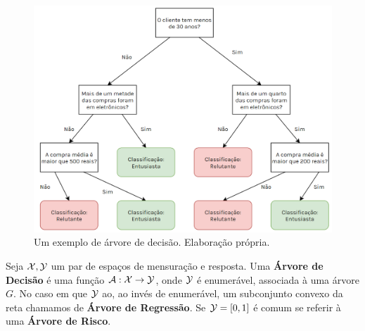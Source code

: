 \begin{figure}
    \centering
    \includegraphics[scale = .55]{imagens/arvore.png}
    \caption{Um exemplo de árvore de decisão. Elaboração própria.}
    \label{fig:arvore}
\end{figure}


\begin{defi}
Seja $\mathcal{X}, \mathcal{Y}$ um par de espaços de mensuração e resposta. Uma \textbf{Árvore de Decisão} é uma função $\mathcal{A}: \mathcal{X} \to \mathcal{Y}$, onde $\mathcal{Y}$ é enumerável, associada à uma árvore $G$. No caso em que $\mathcal{Y}$ ao, ao invés de enumerável, um subconjunto convexo da reta chamamos de \textbf{Árvore de Regressão}. Se $\mathcal{Y} = [0, 1]$ é comum se referir à uma \textbf{Árvore de Risco}.
\end{defi}




